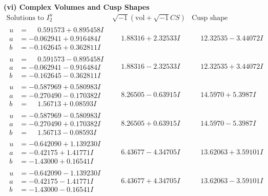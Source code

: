 \documentclass[1p]{elsarticle_modified}
\theoremstyle{definition}
\newcommand{\I}{\sqrt{-1}}
\begin{document}
\newpage\flushleft \textbf{(vi) Complex Volumes and Cusp Shapes}
$$\begin{array}{c|c|c}  
\text{Solutions to }I^u_{2}& \I (\text{vol} + \sqrt{-1}CS) & \text{Cusp shape}\\
 \hline 
\begin{aligned}
u &= \phantom{-}0.591573 + 0.895458 I \\
a &= -0.062941 + 0.916484 I \\
b &= -0.162645 + 0.362811 I\end{aligned}
 & \phantom{-}1.88316 + 2.32533 I & \phantom{-}12.32535 - 3.44072 I \\ \hline\begin{aligned}
u &= \phantom{-}0.591573 - 0.895458 I \\
a &= -0.062941 - 0.916484 I \\
b &= -0.162645 - 0.362811 I\end{aligned}
 & \phantom{-}1.88316 - 2.32533 I & \phantom{-}12.32535 + 3.44072 I \\ \hline\begin{aligned}
u &= -0.587969 + 0.580983 I \\
a &= -0.270490 - 0.170382 I \\
b &= \phantom{-}1.56713 + 0.08593 I\end{aligned}
 & \phantom{-}8.26505 - 0.63915 I & \phantom{-}14.5970 + 5.3987 I \\ \hline\begin{aligned}
u &= -0.587969 - 0.580983 I \\
a &= -0.270490 + 0.170382 I \\
b &= \phantom{-}1.56713 - 0.08593 I\end{aligned}
 & \phantom{-}8.26505 + 0.63915 I & \phantom{-}14.5970 - 5.3987 I \\ \hline\begin{aligned}
u &= -0.642090 + 1.139230 I \\
a &= -0.42175 + 1.41771 I \\
b &= -1.43000 + 0.16541 I\end{aligned}
 & \phantom{-}6.43677 - 4.34705 I & \phantom{-}13.62063 + 3.59101 I \\ \hline\begin{aligned}
u &= -0.642090 - 1.139230 I \\
a &= -0.42175 - 1.41771 I \\
b &= -1.43000 - 0.16541 I\end{aligned}
 & \phantom{-}6.43677 + 4.34705 I & \phantom{-}13.62063 - 3.59101 I \\ \hline\begin{aligned}

\end{aligned}
\end{array}$$
\end{document}
